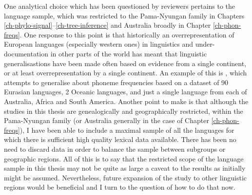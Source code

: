 One analytical choice which has been questioned by reviewers pertains to the language sample, which was restricted to the Pama-Nyungan family in Chapters \ref{ch-phylo-signal}--\ref{ch-tree-inference} and Australia broadly in Chapter \ref{ch-phon-freqs}. One response to this point is that historically an overrepresentation of European languages (especially western ones) in linguistics and under-documentation in other parts of the world has meant that linguistic generalisastions have been made often based on evidence from a single continent, or at least overrepresentation by a single continent. An example of this is \textcite{tambovtsev_phoneme_2007}, which attempts to generalise about phoneme frequencies based on a dataset of 90 Eurasian languages, 2 Oceanic languages, and just a single language from each of Australia, Africa and South America. Another point to make is that although the studies in this thesis are genealogically and geographically restricted, within the Pama-Nyungan family (or Australia generally in the case of Chapter \ref{ch-phon-freqs}), I have been able to include a maximal sample of all the languages for which there is sufficient high quality lexical data available. There has been no need to discard data in order to balance the sample between subgroups or geographic regions. All of this is to say that the restricted scope of the language sample in this thesis may not be quite as large a caveat to the results as initially might be assumed. Nevertheless, future expansion of the study to other linguistic regions would be beneficial and I turn to the question of how to do that now.

